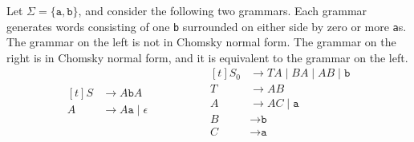 \begin{example}
Let $\Sigma = \{\texttt{a}, \texttt{b}\}$, and consider the following two grammars. Each grammar generates words consisting of one \texttt{b} surrounded on either side by zero or more \texttt{a}s. The grammar on the left is not in Chomsky normal form. The grammar on the right is in Chomsky normal form, and it is equivalent to the grammar on the left.
\begin{equation*}
\begin{aligned}[t]
S	&\rightarrow A\texttt{b}A \\
A	&\rightarrow A\texttt{a} \mid \epsilon
\end{aligned}
\hspace{2cm}
\begin{aligned}[t]
S_{0}	&\rightarrow TA \mid BA \mid AB \mid \texttt{b} \\
T		&\rightarrow AB \\
A		&\rightarrow AC \mid \texttt{a} \\
B		&\rightarrow \texttt{b} \\
C		&\rightarrow \texttt{a}
\end{aligned}
\end{equation*}
\end{example}

